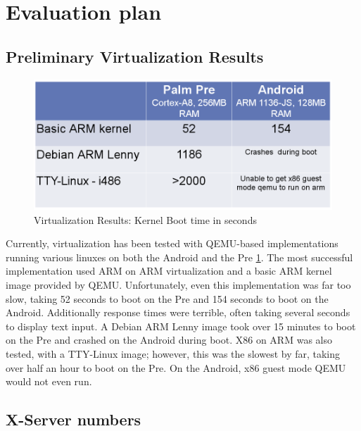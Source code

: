 \section{Evaluation plan}
\label{sec:eval}

\subsection{Preliminary Virtualization Results}

\begin{figure}[tbh]
\centering
\includegraphics[width=1.0\columnwidth]{virtualization_results}
\caption{Virtualization Results: Kernel Boot time in seconds}
\label{fig:virt_results}
\end{figure}

Currently, virtualization has been tested with QEMU-based implementations running various linuxes on both the Android and the Pre \ref{fig:virt_results}.  The most successful implementation used ARM on ARM virtualization and a basic ARM kernel image provided by QEMU.  Unfortunately, even this implementation was far too slow, taking 52 seconds to boot on the Pre and 154 seconds to boot on the Android.  Additionally response times were terrible, often taking several seconds to display text input.  A Debian ARM Lenny image took over 15 minutes to boot on the Pre and crashed on the Android during boot.  X86 on ARM was also tested, with a TTY-Linux image; however, this was the slowest by far, taking over half an hour to boot on the Pre.  On the Android, x86 guest mode QEMU would not even run.

\subsection{X-Server numbers}

